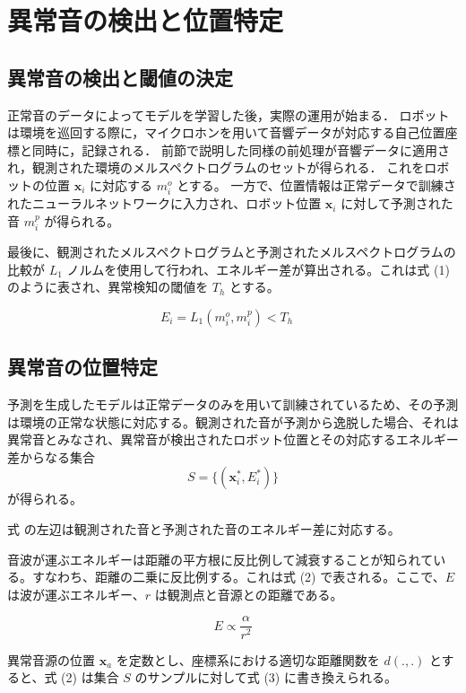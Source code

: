 \documentclass[../main]{subfiles}
\begin{document}
\section{異常音の検出と位置特定}
\label{sec:pmethod_abnormal_detection}


\subsection{異常音の検出と閾値の決定}
正常音のデータによってモデルを学習した後，実際の運用が始まる．
ロボットは環境を巡回する際に，マイクロホンを用いて音響データが対応する自己位置座標と同時に，記録される．
前節で説明した同様の前処理が音響データに適用され，観測された環境のメルスペクトログラムのセットが得られる．
これをロボットの位置 $\mathbf{x}_i$ に対応する $m_i^o$ とする。
一方で、位置情報は正常データで訓練されたニューラルネットワークに入力され、ロボット位置 $\mathbf{x}_i$ に対して予測された音 $m_i^p$ が得られる。

最後に、観測されたメルスペクトログラムと予測されたメルスペクトログラムの比較が $L_1$ ノルムを使用して行われ、エネルギー差が算出される。これは式 (1) のように表され、異常検知の閾値を $T_h$ とする。

\begin{equation}
    E_i = L_1(m_i^o, m_i^p) < T_h \quad
\end{equation}

\subsection{異常音の位置特定}

予測を生成したモデルは正常データのみを用いて訓練されているため、その予測は環境の正常な状態に対応する。観測された音が予測から逸脱した場合、それは異常音とみなされ、異常音が検出されたロボット位置とその対応するエネルギー差からなる集合
\[
S = \{ (\mathbf{x}_i^*, E_i^*) \}
\]
が得られる。



式  の左辺は観測された音と予測された音のエネルギー差に対応する。

音波が運ぶエネルギーは距離の平方根に反比例して減衰することが知られている。すなわち、距離の二乗に反比例する。これは式 (2) で表される。ここで、$E$ は波が運ぶエネルギー、$r$ は観測点と音源との距離である。

\begin{equation}
    E \propto \frac{\alpha}{r^2}
\end{equation}

異常音源の位置 $\mathbf{x}_a$ を定数とし、座標系における適切な距離関数を $d(., .)$ とすると、式 (2) は集合 $S$ のサンプルに対して式 (3) に書き換えられる。
\end{document}
